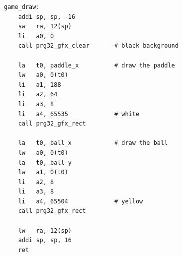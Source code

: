 \begin{lstlisting}[style=asm,caption={The \code{draw} of the complete game. Compare it line for line with \code{pong\_graphics\_draw} in the repository.}]
game_draw:
    addi sp, sp, -16
    sw   ra, 12(sp)
    li   a0, 0
    call prg32_gfx_clear       # black background

    la   t0, paddle_x          # draw the paddle
    lw   a0, 0(t0)
    li   a1, 188
    li   a2, 64
    li   a3, 8
    li   a4, 65535             # white
    call prg32_gfx_rect

    la   t0, ball_x            # draw the ball
    lw   a0, 0(t0)
    la   t0, ball_y
    lw   a1, 0(t0)
    li   a2, 8
    li   a3, 8
    li   a4, 65504             # yellow
    call prg32_gfx_rect

    lw   ra, 12(sp)
    addi sp, sp, 16
    ret
\end{lstlisting}